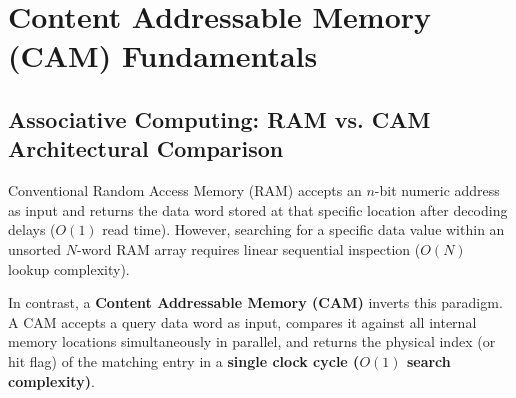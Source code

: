 \documentclass[11pt,a4paper,oneside]{report}
\begin{document}
\chapter[CAM Fundamentals]{Content Addressable Memory (CAM) Fundamentals}

\section{Associative Computing: RAM vs. CAM Architectural Comparison}
Conventional Random Access Memory (RAM) accepts an $n$-bit numeric address as input and returns the data word stored at that specific location after decoding delays ($O(1)$ read time). However, searching for a specific data value within an unsorted $N$-word RAM array requires linear sequential inspection ($O(N)$ lookup complexity).

In contrast, a \textbf{Content Addressable Memory (CAM)} inverts this paradigm. A CAM accepts a query data word as input, compares it against all internal memory locations simultaneously in parallel, and returns the physical index (or hit flag) of the matching entry in a \textbf{single clock cycle ($O(1)$ search complexity)}.
\end{document}
